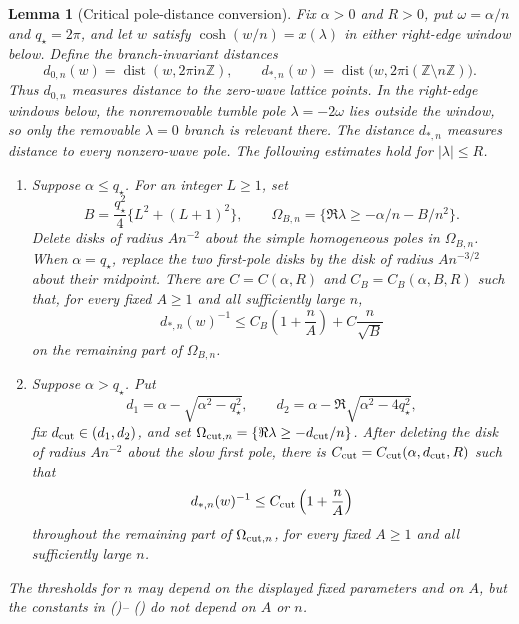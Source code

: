 \documentclass[twoside,10pt]{article}
\numberwithin{equation}{section}
\theoremstyle{slbody}
\newtheorem{lemma}[theorem]{Lemma}
\theoremstyle{definition}
\theoremstyle{remark}
\newcommand{\Z}{\mathbb Z}
\renewcommand{\eqref}[1]{%
  \textup{{\normalfont(\oldstylenums{\ref{#1}}}\normalfont)}}
\begin{document}
\begin{lemma}[Critical pole-distance conversion]
\label{lem:critical-pole-distance}
Fix $\alpha>0$ and $R>0$, put $\omega=\alpha/n$ and $q_\star=2\pi$,
and let $w$ satisfy $\cosh(w/n)=x(\lambda)$ in either right-edge
window below.  Define the branch-invariant distances
\[
 d_{0,n}(w)=\operatorname{dist}(w,2\pi\mathrm i n\Z),\qquad
 d_{*,n}(w)=\operatorname{dist}
   \bigl(w,2\pi\mathrm i(\Z\setminus n\Z)\bigr).
\]
Thus $d_{0,n}$ measures distance to the zero-wave lattice points.  In
the right-edge windows below, the nonremovable tumble pole
$\lambda=-2\omega$ lies outside the window, so only the removable
$\lambda=0$ branch is relevant there.  The distance $d_{*,n}$ measures
distance to every nonzero-wave pole.
The following estimates hold for $|\lambda|\le R$.
\begin{enumerate}
\item Suppose $\alpha\le q_\star$.  For an integer $L\ge1$, set
  \[
   B=\frac{q_\star^2}{4}\{L^2+(L+1)^2\},\qquad
   \Omega_{B,n}=\{\Re\lambda\ge-\alpha/n-B/n^2\}.
  \]
  Delete disks of radius $An^{-2}$ about the simple homogeneous poles
  in $\Omega_{B,n}$.  When $\alpha=q_\star$, replace the two first-pole
  disks by the disk of radius $An^{-3/2}$ about their midpoint.  There
  are $C=C(\alpha,R)$ and $C_B=C_B(\alpha,B,R)$ such that, for every
  fixed $A\ge1$ and all sufficiently large $n$,
  \begin{equation}\label{eq:critical-pole-distance-subcritical}
   d_{*,n}(w)^{-1}
   \le C_B\left(1+\frac nA\right)+C\frac n{\sqrt B}
  \end{equation}
  on the remaining part of $\Omega_{B,n}$.
\item Suppose $\alpha>q_\star$.  Put
  \[
   d_1=\alpha-\sqrt{\alpha^2-q_\star^2},\qquad
   d_2=\alpha-\Re\sqrt{\alpha^2-4q_\star^2},
  \]
  fix $d_{\rm cut}\in(d_1,d_2)$, and set
  $\Omega_{{\rm cut},n}=\{\Re\lambda\ge-d_{\rm cut}/n\}$.  After deleting the disk of
  radius $An^{-2}$ about the slow first pole, there is
  $C_{\rm cut}=C_{\rm cut}(\alpha,d_{\rm cut},R)$ such that
  \begin{equation}\label{eq:critical-pole-distance-supercritical}
   d_{*,n}(w)^{-1}\le C_{\rm cut}\left(1+\frac nA\right)
  \end{equation}
  throughout the remaining part of $\Omega_{{\rm cut},n}$, for every fixed
  $A\ge1$ and all sufficiently large $n$.
\end{enumerate}
The thresholds for $n$ may depend on the displayed fixed parameters
and on $A$, but the constants in
\eqref{eq:critical-pole-distance-subcritical}--
\eqref{eq:critical-pole-distance-supercritical} do not depend on
$A$ or $n$.
\end{lemma}
\end{document}
